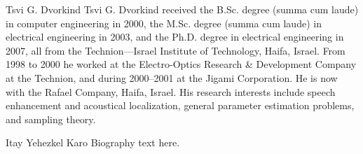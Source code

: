 \documentclass[journal]{IEEEtran}
\begin{document}
\begin{IEEEbiography}{Tsvi G. Dvorkind}
Tsvi G. Dvorkind received the B.Sc. degree (summa cum laude) in computer engineering in 2000, the M.Sc. degree (summa cum laude) in electrical engineering in 2003, and the Ph.D. degree in electrical engineering in 2007, all from the Technion—Israel Institute of Technology, Haifa, Israel.
From 1998 to 2000 he worked at the Electro-Optics Research & Development Company at the Technion, and during 2000–2001 at the Jigami Corporation.
He is now with the Rafael Company, Haifa, Israel.
His research interests include speech enhancement and acoustical localization, general parameter estimation problems, and sampling theory.
\end{IEEEbiography}


\begin{IEEEbiography}{Itay Yehezkel Karo}
Biography text here.
\end{IEEEbiography}






\end{document}
